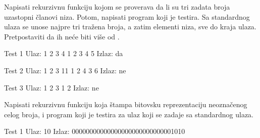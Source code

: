 \begin{Exercise}[label=114]
Napisati rekurzivnu funkciju kojom se proverava da li su tri
  zadata broja uzastopni članovi niza. Potom, napisati program koji
  je testira. Sa standardnog ulaza se unose najpre tri tražena
  broja, a zatim elementi niza, sve do kraja ulaza. Pretpostaviti da
  ih neće biti više od .
  
\begin{miditest}
\begin{test}{Test 1}
Ulaz:     1 2 3 4 1 2 3 4 5 
Izlaz:    da                     
\end{test}
\end{miditest}
\begin{miditest}
\begin{test}{Test 2}
Ulaz:     1 2 3 11 1 2 4 3 6 
Izlaz:    ne                    
\end{test}
\end{miditest}

\begin{miditest}
\begin{test}{Test 3}
Ulaz:     1 2 3 1 2
Izlaz:    ne 
\end{test}
\end{miditest}
\end{Exercise}
\begin{Answer}[ref=114]
\end{Answer}


\begin{Exercise}[label=115]

Napisati rekurzivnu funkciju koja štampa bitovsku
  reprezentaciju neoznačenog celog broja, i program koji je
  testira za ulaz koji se zadaje sa standardnog ulaza.

\begin{maxitest}
\begin{test}{Test 1}
Ulaz:       10                                 
Izlaz:      00000000000000000000000000001010                    
\end{test}
\end{maxitest}
\end{Exercise}


